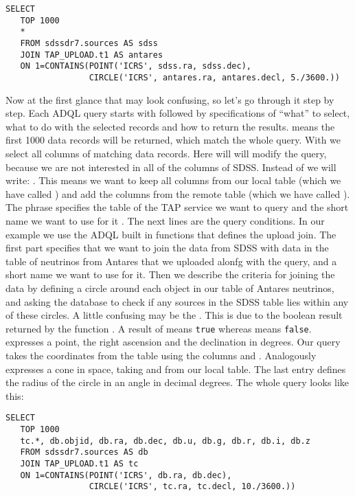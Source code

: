 \documentclass[twoside]{article}[12pt]
\begin{document}
\lstset{style=daiquiri, language=SQL}
\begin{lstlisting}
SELECT
   TOP 1000
   *
   FROM sdssdr7.sources AS sdss
   JOIN TAP_UPLOAD.t1 AS antares
   ON 1=CONTAINS(POINT('ICRS', sdss.ra, sdss.dec),
                 CIRCLE('ICRS', antares.ra, antares.decl, 5./3600.))
\end{lstlisting}

Now at the first glance that may look confusing, so let's go through it
step by step. Each ADQL query starts with  followed by
specifications of ``what'' to select, what to do with the selected records
and how to return the results. 
means the first 1000 data records will be returned, which match the
whole query. 
With \sql{*} we select all columns of matching data records. Here will
will modify the query, because we are not interested in all of the
columns of SDSS. Instead of \sql{*} we will write: 
. This
means we want to keep all columns from our local table (which we have called
) and add the columns from the remote table (which we have called ). 
The phrase  specifies the table of the TAP service we
want to query  and the short name we want to use for it . 
The next lines are the query conditions. In our example we use the ADQL
built in functions that defines the upload join.
The first part  specifies that we want to join the data from SDSS with
data in the table of neutrinos from Antares that we uploaded alonfg with the query,
and a short name we want to use for it.
Then we describe the criteria for joining the data by defining a
circle around each object in our table of Antares neutrinos, and asking the database to
check if any sources in the SDSS table lies within any of these
circles. 
A little confusing may be the . This is due to the boolean
result returned by the function . A result of 
means \verb|true| whereas  means \verb|false|. 
 expresses a point, the right ascension and the declination
in degrees. Our query takes the coordinates from the table using the columns
 and . 
Analogously  expresses a cone in space, taking  and
 from our local table. The last entry defines the radius of
the circle in an angle in decimal degrees. The whole query looks like
this: 

\lstset{style=daiquiri, language=SQL}
\begin{lstlisting}
SELECT
   TOP 1000
   tc.*, db.objid, db.ra, db.dec, db.u, db.g, db.r, db.i, db.z
   FROM sdssdr7.sources AS db
   JOIN TAP_UPLOAD.t1 AS tc
   ON 1=CONTAINS(POINT('ICRS', db.ra, db.dec),
                 CIRCLE('ICRS', tc.ra, tc.decl, 10./3600.))
\end{lstlisting}
\end{document}
